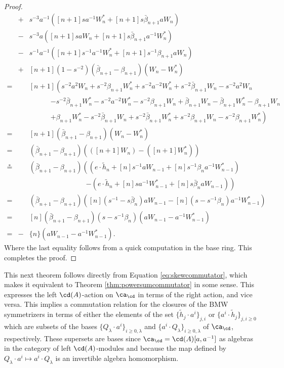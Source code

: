\begin{proof}
\begin{eqnarray*}
&+& s^{-3}a^{-1}\left( [n+1]sa^{-1}W^*_n + [n+1]s\bar{\beta}_{n+1}aW_n \right) \\
&-&s^{-3}a\left( [n+1]saW_n + [n+1]s\bar{\beta}_{n+1}a^{-1}W^*_n \right) \\
&-& s^{-1}a^{-1}\left( [n+1]s^{-1}a^{-1}W^*_n + [n+1]s^{-1}\beta_{n+1}aW_n \right) \\
&+& [n+1]\left(1-s^{-2} \right) \left( \bar{\beta}_{n+1} - \beta_{n+1} \right) \left( W_n - W^*_n \right)\\
=&& [n+1]\left( s^{-2}a^2W_n + s^{-2}\beta_{n+1}W^*_n + s^{-2}a^{-2}W^*_n + s^{-2}\bar{\beta}_{n+1}W_n - s^{-2}a^{2}W_n \right. \\
&&\qquad\quad \left. - s^{-2}\bar{\beta}_{n+1}W^*_n - s^{-2}a^{-2}W^*_n - s^{-2}\beta_{n+1}W_n + \bar{\beta}_{n+1}W_n - \bar{\beta}_{n+1}W^*_n - \beta_{n+1}W_n \right. \\
&&\qquad\quad \left. + \beta_{n+1}W^*_n - s^{-2}\bar{\beta}_{n+1}W_n + s^{-2}\bar{\beta}_{n+1}W^*_n + s^{-2}\beta_{n+1}W_n - s^{-2}\beta_{n+1}W^*_n \right) \\
=&& [n+1]\left( \bar{\beta}_{n+1} - \beta_{n+1} \right) \left( W_n - W^*_n \right) \\
=&& \left( \bar{\beta}_{n+1} - \beta_{n+1} \right) \left( \left( [n+1]W_n \right) - \left( [n+1]W^*_n \right) \right) \\
\overset{\ast}{=}&& \left( \bar{\beta}_{n+1} - \beta_{n+1} \right) \left( \left( e \cdot \tilde{h}_{n} + [n]s^{-1}aW_{n-1} + [n]s^{-1}\beta_{n}a^{-1}W^*_{n-1} \right) \right. \\
&& \qquad\qquad\qquad\qquad \left. -\left( e \cdot \tilde{h}_{n} + [n]sa^{-1}W^*_{n-1} + [n]s\bar{\beta}_{n}aW_{n-1} \right) \right) \\
=&& \left( \bar{\beta}_{n+1} - \beta_{n+1} \right) \left( [n]\left( s^{-1} - s\bar{\beta}_{n} \right) aW_{n-1} - [n]\left( s-s^{-1}\beta_{n} \right) a^{-1}W^*_{n-1} \right) \\
=&& [n]\left(\bar{\beta}_{n+1} - \beta_{n+1} \right) \left( s - s^{-1}\beta_{n} \right) \left( aW_{n-1} - a^{-1}W^*_{n-1} \right) \\
=&-& \{n\}\left( aW_{n-1} - a^{-1}W^*_{n-1} \right).
\end{eqnarray*}
Where the last equality follows from a quick computation in the base ring. This completes the proof.
\end{proof}

This next theorem follows directly from Equation \eqref{eq:skewcommutator}, which makes it equivalent to Theorem \ref{thm:powersumcommutator} in some sense. This expresses the left $\cd(A)$-action on $\ca_\cd$ in terms of the right action, and vice versa. This implies a commutation relation for the closures of the BMW symmetrizers in terms of either the elements of the set $\{\tilde{h}_j \cdot a^i \}_{j, i}$ or $\{ a^i \cdot \tilde{h}_j \}_{j, i \geq 0}$ which are subsets of the bases $\{ Q_\lambda \cdot a^i \}_{i \geq 0, \lambda}$ and $\{ a^i \cdot Q_\lambda \}_{i \geq 0, \lambda}$ of $\ca_\cd$, respectively. These supersets are bases since $\ca_\cd = \cd(A)[a, a^{-1}]$ as algebras in the category of left $\cd(A)$-modules and because the map defined by $Q_\lambda \cdot a^i \mapsto a^i \cdot Q_\lambda$ is an invertible algebra homomorphism. 

